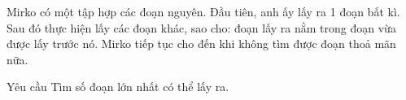 Mirko có một tập hợp các đoạn nguyên. Đầu tiên, anh ấy lấy ra 1 đoạn bất kì. Sau đó thực hiện lấy các đoạn khác, sao cho: đoạn lấy ra nằm trong đoạn vừa được lấy trước nó. Mirko tiếp tục cho đến khi không tìm được đoạn thoả mãn nữa.  

Yêu cầu
Tìm số đoạn lớn nhất có thể lấy ra.